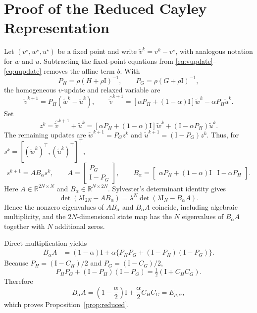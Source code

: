 \documentclass[11pt]{article}
\theoremstyle{definition}
\newcommand{\R}{\mathbb{R}}
\newcommand{\Id}{\mathrm{I}}
\begin{document}
\section{Proof of the Reduced Cayley Representation}\label{app:reduced}
Let $(v^\star,w^\star,u^\star)$ be a fixed point and write
$\widetilde v^k=v^k-v^\star$, with analogous notation for $w$ and $u$.
Subtracting the fixed-point equations from \eqref{eq:vupdate}--\eqref{eq:uupdate}
removes the affine term $b$. With
\[
P_H=\rho(H+\rho\Id)^{-1},\qquad
P_G=\rho(G+\rho\Id)^{-1},
\]
the homogeneous $v$-update and relaxed variable are
\[
\widetilde v^{k+1}=P_H(\widetilde w^k-\widetilde u^k),\qquad
\widehat{\widetilde v}^{k+1}
=[\alpha P_H+(1-\alpha)\Id]\widetilde w^k
-\alpha P_H\widetilde u^k.
\]
Set
\[
z^k=\widehat{\widetilde v}^{k+1}+\widetilde u^k
=[\alpha P_H+(1-\alpha)\Id]\widetilde w^k
+(\Id-\alpha P_H)\widetilde u^k.
\]
The remaining updates are
$\widetilde w^{k+1}=P_Gz^k$ and
$\widetilde u^{k+1}=(\Id-P_G)z^k$. Thus, for
$s^k=[(\widetilde w^k)^\top,(\widetilde u^k)^\top]^\top$,
\[
s^{k+1}=AB_\alpha s^k,\qquad
A=\begin{bmatrix}P_G\\\Id-P_G\end{bmatrix},\qquad
B_\alpha=
\begin{bmatrix}
\alpha P_H+(1-\alpha)\Id&\Id-\alpha P_H
\end{bmatrix}.
\]
Here $A\in\R^{2N\times N}$ and $B_\alpha\in\R^{N\times2N}$. Sylvester's
determinant identity gives
\[
\det(\lambda\Id_{2N}-AB_\alpha)
=\lambda^N\det(\lambda\Id_N-B_\alpha A).
\]
Hence the nonzero eigenvalues of $AB_\alpha$ and $B_\alpha A$ coincide,
including algebraic multiplicity, and the $2N$-dimensional state map has the
$N$ eigenvalues of $B_\alpha A$ together with $N$ additional zeros.

Direct multiplication yields
\[
\begin{aligned}
B_\alpha A
&=(1-\alpha)\Id+\alpha\{
P_HP_G+(\Id-P_H)(\Id-P_G)\}.
\end{aligned}
\]
Because $P_H=(\Id-C_H)/2$ and $P_G=(\Id-C_G)/2$,
\[
P_HP_G+(\Id-P_H)(\Id-P_G)
=\tfrac12(\Id+C_HC_G).
\]
Therefore
\[
B_\alpha A
=\left(1-\frac{\alpha}{2}\right)\Id
+\frac{\alpha}{2}C_HC_G=E_{\rho,\alpha},
\]
which proves Proposition~\ref{prop:reduced}.
\end{document}
